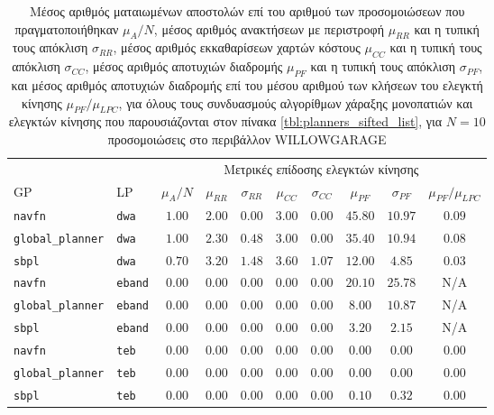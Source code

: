 \begin{table}[h]
\renewcommand{\arraystretch}{1.3}
\begin{tabular}{llcccccccc}
  & & \multicolumn{8}{c}{Μετρικές επίδοσης ελεγκτών κίνησης} \\
  \cline{3-10}
    GP & LP & $\mu_{A} / N$ & $\mu_{RR}$ & $\sigma_{RR}$ & $\mu_{CC}$ & $\sigma_{CC}$ & $\mu_{PF}$ & $\sigma_{PF}$ & $\mu_{PF} / \mu_{LPC}$ \\ \toprule
    \texttt{navfn} & \texttt{dwa} & $1.00$ & $2.00$ & $0.00$ & $3.00$ & $0.00$ & $45.80$ & $10.97$ & $0.09$ \\
    \texttt{global\_planner} & \texttt{dwa} & $1.00$ & $2.30$ & $0.48$ & $3.00$ & $0.00$ & $35.40$ & $10.94$ & $0.08$ \\
    \texttt{sbpl} & \texttt{dwa} & $0.70$ & $3.20$ & $1.48$ & $3.60$ & $1.07$ & $12.00$ & $4.85$ & $0.03$ \\
    \texttt{navfn} & \texttt{eband} & $0.00$ & $0.00$ & $0.00$ & $0.00$ & $0.00$ & $20.10$ & $25.78$ & N/A \\
    \texttt{global\_planner} & \texttt{eband} & $0.00$ & $0.00$ & $0.00$ & $0.00$ & $0.00$ & $8.00$ & $10.87$ & N/A \\
    \texttt{sbpl} & \texttt{eband} & $0.00$ & $0.00$ & $0.00$ & $0.00$ & $0.00$ & $3.20$ & $2.15$ & N/A \\
    \texttt{navfn} & \texttt{teb} & $0.00$ & $0.00$ & $0.00$ & $0.00$ & $0.00$ & $0.00$ & $0.00$ & $0.00$ \\
    \texttt{global\_planner} & \texttt{teb} & $0.00$ & $0.00$ & $0.00$ & $0.00$ & $0.00$ & $0.00$ & $0.00$ & $0.00$ \\
    \texttt{sbpl} & \texttt{teb} & $0.00$ & $0.00$ & $0.00$ & $0.00$ & $0.00$ & $0.10$ & $0.32$ & $0.00$ \\ \bottomrule
\end{tabular}
\caption{\small Μέσος αριθμός ματαιωμένων αποστολών επί του αριθμού των
      προσομοιώσεων που πραγματοποιήθηκαν $\mu_A / N$, μέσος αριθμός ανακτήσεων
      με περιστροφή $\mu_{RR}$ και η τυπική τους απόκλιση $\sigma_{RR}$, μέσος
      αριθμός εκκαθαρίσεων χαρτών κόστους $\mu_{CC}$ και η τυπική τους απόκλιση
      $\sigma_{CC}$, μέσος αριθμός αποτυχιών διαδρομής $\mu_{PF}$ και η τυπική
      τους απόκλιση $\sigma_{PF}$, και μέσος αριθμός αποτυχιών διαδρομής επί
      του μέσου αριθμού των κλήσεων του ελεγκτή κίνησης $\mu_{PF} / \mu_{LPC}$,
      για όλους τους συνδυασμούς αλγορίθμων χάραξης μονοπατιών και ελεγκτών
      κίνησης που παρουσιάζονται στον πίνακα \ref{tbl:planners_sifted_list},
      για $N=10$ προσομοιώσεις στο περιβάλλον WILLOWGARAGE}
\label{tbl:info_failures_willowgarage}
\end{table}


